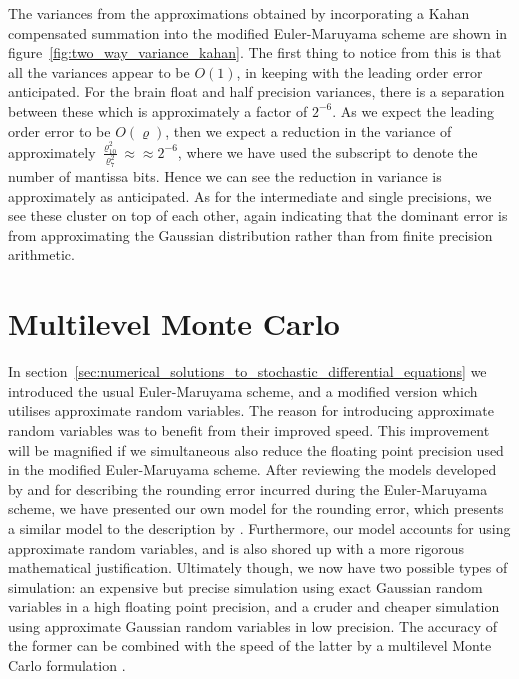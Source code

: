 \documentclass[manuscript,review]{acmart}
\begin{document}
The variances from the approximations obtained by incorporating a Kahan compensated summation into the modified Euler-Maruyama scheme are shown in figure~\ref{fig:two_way_variance_kahan}. The first thing to notice from this is that all the variances appear to be $ O(1) $, in keeping with the leading order error anticipated. For the brain float and half precision variances, there is a separation between these which is approximately a factor of $ 2^{-6} $. As we expect the leading order error to be $ O(\varrho) $, then we expect a reduction in the variance of approximately $ \tfrac{\varrho^2_{10}}{\varrho^2_{7}} \approx \approx 2^{-6} $, where we have used the subscript to denote the number of mantissa bits. Hence we can see the reduction in variance is approximately as anticipated. As for the intermediate and single precisions, we see these cluster on top of each other, again indicating that the dominant error is from approximating the Gaussian distribution rather than from finite precision arithmetic. 

\section{Multilevel Monte Carlo}
\label{sec:multilevel_monte_carlo}

In section~\ref{sec:numerical_solutions_to_stochastic_differential_equations} we introduced the usual Euler-Maruyama scheme, and a modified version which utilises approximate random variables. The reason for introducing approximate random variables was to benefit from their improved speed. This improvement will be magnified if we simultaneous also reduce the floating point precision used in the modified Euler-Maruyama scheme. After reviewing the models developed by \citet{arciniega2003rounding} and \citet{omland2016mixed} for describing the rounding error incurred during the Euler-Maruyama scheme, we have presented our own model for the rounding error, which presents a similar model to the description by \citet{arciniega2003rounding}. Furthermore, our model accounts for using approximate random variables, and is also shored up with a more rigorous mathematical justification. Ultimately though, we now have two possible types of simulation: an expensive but precise simulation using exact Gaussian random variables in a high floating point precision, and a cruder and cheaper simulation using approximate Gaussian random variables in low precision. The accuracy of the former can be combined with the speed of the latter by a multilevel Monte Carlo formulation \citep{giles2008multilevel,giles2015multilevel_review}. 
\end{document}
